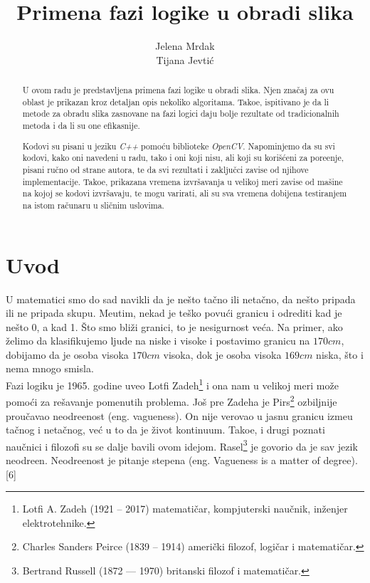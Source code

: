 \documentclass[12pt,a4paper]{article}
\title{Primena fazi logike u obradi slika}
\author{Jelena Mrdak\\ Tijana Jevti\' c}
\theoremstyle{definition}
\theoremstyle{remark}
\theoremstyle{plain}
\begin{document}
\maketitle

\begin{abstract}
U ovom radu je predstavljena primena fazi logike u obradi slika. Njen zna\v caj za ovu oblast je prikazan kroz detaljan opis nekoliko algoritama. Tako\dj e, ispitivano je da li metode za obradu slika zasnovane na fazi logici daju bolje rezultate od tradicionalnih metoda i da li su one efikasnije.

Kodovi su pisani u jeziku \textit{C++} pomo\' cu biblioteke \textit{OpenCV}.  Napominjemo da su svi kodovi, kako oni navedeni u radu, tako i oni koji nisu, ali koji su kori\v s\' ceni za pore\dj enje, pisani ru\v cno od strane autora, te da svi rezultati i zaklju\v cci zavise od njihove implementacije. Tako\dj e, prikazana vremena izvr\v savanja u velikoj meri zavise od ma\v sine na kojoj se kodovi izvr\v savaju, te mogu varirati, ali su sva vremena dobijena testiranjem na istom ra\v cunaru u sli\v cnim uslovima.
\end{abstract}

\newpage
\tableofcontents

\newpage
\section{Uvod}
U matematici smo do sad navikli da je ne\v sto ta\v cno ili neta\v cno, da ne\v sto pripada ili ne pripada skupu. Me\dj utim, nekad je te\v sko povu\' ci granicu i odrediti kad je ne\v sto 0, a kad 1. \v Sto smo bli\v zi granici, to je nesigurnost ve\' ca. Na primer, ako \v zelimo da klasifikujemo ljude na niske i visoke i postavimo granicu na $170 cm$, dobijamo da je osoba visoka $170 cm$ visoka, dok je osoba visoka $169 cm$ niska, \v sto i nema mnogo smisla.\\

Fazi logiku je 1965. godine uveo Lotfi Zadeh\footnote{Lotfi A. Zadeh (1921 – 2017) matemati\v car, kompjuterski nau\v cnik, in\v zenjer elektrotehnike.} i ona nam u velikoj meri mo\v ze pomo\' ci za re\v savanje pomenutih problema. Jo\v s pre Zadeha je Pirs\footnote{Charles Sanders Peirce (1839 – 1914) ameri\v cki filozof, logi\v car i matemati\v car.} ozbiljnije prou\v cavao neodre\dj enost (eng. vagueness). On nije verovao u jasnu granicu izme\dj u ta\v cnog i neta\v cnog, ve\' c u to da je \v zivot kontinuum. Tako\dj e, i drugi poznati nau\v cnici i filozofi su se dalje bavili ovom idejom. Rasel\footnote{Bertrand Russell (1872 — 1970) britanski filozof i matemati\v car.} je govorio da je sav jezik neodre\dj en. Neodre\dj enost je pitanje stepena (eng. Vagueness is a matter of degree). [6]\\
\end{document}
